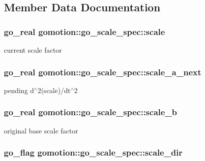 \subsection{Member Data Documentation}
\hypertarget{structgomotion_1_1go__scale__spec_a592f5bd1c5d775d30e25b798900a2c30}{
\subsubsection[{scale}]{\setlength{\rightskip}{0pt plus 5cm}go\-\_\-real gomotion\-::go\-\_\-scale\-\_\-spec\-::scale}}\label{structgomotion_1_1go__scale__spec_a592f5bd1c5d775d30e25b798900a2c30}
current scale factor \hypertarget{structgomotion_1_1go__scale__spec_a1786056a5451cb1841cf42f23f079c61}{
\subsubsection[{scale\-\_\-a\-\_\-next}]{\setlength{\rightskip}{0pt plus 5cm}go\-\_\-real gomotion\-::go\-\_\-scale\-\_\-spec\-::scale\-\_\-a\-\_\-next}}\label{structgomotion_1_1go__scale__spec_a1786056a5451cb1841cf42f23f079c61}
pending d$^\wedge$2(scale)/dt$^\wedge$2 \hypertarget{structgomotion_1_1go__scale__spec_ac734b7e45bc1da45992fdf6f1fdc792d}{
\subsubsection[{scale\-\_\-b}]{\setlength{\rightskip}{0pt plus 5cm}go\-\_\-real gomotion\-::go\-\_\-scale\-\_\-spec\-::scale\-\_\-b}}\label{structgomotion_1_1go__scale__spec_ac734b7e45bc1da45992fdf6f1fdc792d}
original base scale factor \hypertarget{structgomotion_1_1go__scale__spec_af13cc2a23a17aba5aae5fbafc47a8428}{
\subsubsection[{scale\-\_\-dir}]{\setlength{\rightskip}{0pt plus 5cm}go\-\_\-flag gomotion\-::go\-\_\-scale\-\_\-spec\-::scale\-\_\-dir}}\label{structgomotion_1_1go__scale__spec_af13cc2a23a17aba5aae5fbafc47a8428}

